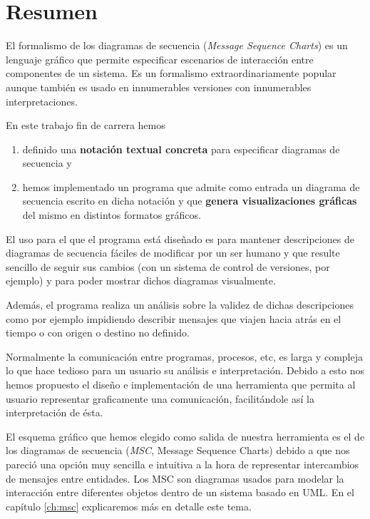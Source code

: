 \chapter*{Resumen}

El formalismo de los diagramas de secuencia (\emph{Message Sequence Charts})
es un lenguaje gráfico que permite especificar escenarios de
interacción entre componentes de un sistema. Es un formalismo extraordinariamente popular
aunque también es usado en innumerables versiones con innumerables
interpretaciones.

En este trabajo fin de carrera hemos
\begin{enumerate}
\item definido una \textbf{notación textual concreta} para especificar
 diagramas de secuencia y
\item hemos implementado un programa que admite como entrada un
  diagrama de secuencia escrito en dicha notación y que \textbf{genera
  visualizaciones gráficas} del mismo en distintos formatos gráficos.
\end{enumerate}

El uso para el que el programa está diseñado es para mantener
descripciones de diagramas de secuencia fáciles de modificar por un
ser humano y que resulte sencillo de seguir sus cambios (con un
sistema de control de versiones, por ejemplo) y para poder mostrar
dichos diagramas visualmente.

Además, el programa realiza un análisis sobre la validez de dichas
descripciones como por ejemplo impidiendo describir mensajes que
viajen hacia atrás en el tiempo o con origen o destino no definido.


Normalmente la comunicación entre programas, procesos, etc, es larga y
compleja lo que hace tedioso para un usuario su análisis e
interpretación. Debido a esto nos hemos propuesto el diseño e
implementación de una herramienta que permita al usuario representar
graficamente una comunicación, facilitándole así la interpretación de
ésta. 

El esquema gráfico que hemos elegido como salida de nuestra
herramienta es el de los diagramas de secuencia (\textit{MSC}, Message
Sequence Charts) debido a que nos pareció una opción muy sencilla e
intuitiva a la hora de representar intercambios de mensajes entre
entidades. Los MSC son diagramas usados para modelar la interacción
entre diferentes objetos dentro de un sistema basado en UML. En el
capítulo \ref{ch:msc} explicaremos más en detalle este tema.

